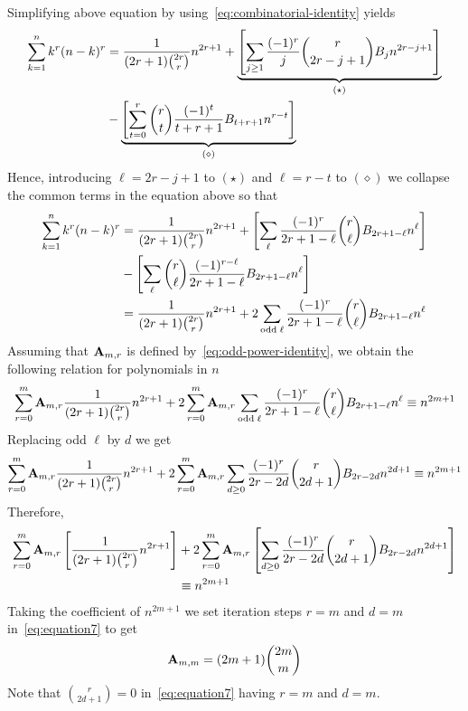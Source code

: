 Simplifying above equation by using~\eqref{eq:combinatorial-identity} yields
\begin{equation*}
    \begin{split}
        \sum_{k=1}^{n} k^{r} (n-k)^{r}
        &= \frac{1}{(2r+1) \binom{2r}r} n^{2r+1}
        + \underbrace{\left[ \sum_{j \geq 1} \frac{(-1)^r}{j} \binom{r}{2r-j+1} {B}\sb{j} n^{2r-j+1} \right]}_{(\star)} \\
        &- \underbrace{\left[ \sum_{t=0}^{r} \binom{r}{t} \frac{(-1)^t}{t+r+1} {B}\sb{t+r+1} n^{r-t} \right]}_{(\diamond)}
    \end{split}
\end{equation*}
Hence, introducing $\ell=2r-j+1$ to $(\star)$ and $\ell=r-t$ to $(\diamond)$
we collapse the common terms in the equation above so that
\begin{equation*}
    \begin{split}
        \sum_{k=1}^{n} k^{r} (n-k)^{r}
        &= \frac{1}{(2r+1) \binom{2r}r} n^{2r+1}
        + \left[ \sum_{\ell} \frac{(-1)^r}{2r+1-\ell} \binom{r}{\ell} {B}\sb{2r+1-\ell} n^{\ell} \right] \\
        &- \left[ \sum_{\ell} \binom{r}{\ell} \frac{(-1)^{r-\ell}}{2r+1-\ell} {B}\sb{2r+1-\ell} n^{\ell} \right]\\
        &= \frac{1}{(2r+1) \binom{2r}r} n^{2r+1} + 2 \sum_{\mathrm{odd \; \ell}} \frac{(-1)^r}{2r+1-\ell} \binom{r}{\ell} {B}\sb{2r+1-\ell} n^{\ell}
    \end{split}
\end{equation*}
Assuming that ${\mathbf{A}} \sb{m,r}$ is defined by~\eqref{eq:odd-power-identity},
we obtain the following relation for polynomials in $n$
\begin{equation*}
    \sum_{r=0}^{m} {\mathbf{A}} \sb{m,r} \frac{1}{(2r+1) \binom{2r}r} n^{2r+1}
    + 2 \sum_{r=0}^{m} {\mathbf{A}} \sb{m,r} \sum_{\mathrm{odd \; \ell}} \frac{(-1)^r}{2r+1-\ell} \binom{r}{\ell} {B}\sb{2r+1-\ell} n^{\ell}
    \equiv n^{2m+1}
\end{equation*}
Replacing odd $\ell$ by $d$ we get
\begin{align*}
    \sum_{r=0}^{m} {\mathbf{A}} \sb{m,r} \frac{1}{(2r+1) \binom{2r}r} n^{2r+1}
    + 2 \sum_{r=0}^{m} {\mathbf{A}} \sb{m,r} \sum_{d \geq 0} \frac{(-1)^r}{2r-2d} \binom{r}{2d+1} {B}\sb{2r-2d} n^{2d+1}
    \equiv n^{2m+1}
\end{align*}
Therefore,
\begin{equation}
    \begin{split}
        \sum_{r=0}^{m} {\mathbf{A}} \sb{m,r} \left[ \frac{1}{(2r+1) \binom{2r}r} n^{2r+1} \right]
        &+ 2 \sum_{r=0}^{m} {\mathbf{A}} \sb{m,r} \left[ \sum_{d \geq 0} \frac{(-1)^r}{2r-2d} \binom{r}{2d+1} {B}\sb{2r-2d} n^{2d+1} \right] \\
        &\equiv n^{2m+1}
    \end{split}
    \label{eq:equation7}
\end{equation}
Taking the coefficient of $n^{2m+1}$ we set iteration steps $r=m$ and $d=m$ in~\eqref{eq:equation7} to get
\begin{equation*}
    {\mathbf{A}} \sb{m,m} = (2m+1)\binom{2m}{m}
\end{equation*}
Note that $\binom{r}{2d+1}=0$ in~\eqref{eq:equation7} having $r=m$ and $d=m$.

